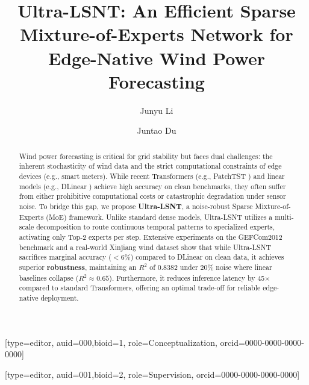 \documentclass[a4paper,fleqn]{cas-sc}
\begin{document}
\let\WriteBookmarks\relax
\def\floatpagepagefraction{1}
\def\textpagefraction{.001}


\title [mode = title]{Ultra-LSNT: An Efficient Sparse Mixture-of-Experts Network for Edge-Native Wind Power Forecasting}

\author[1]{Junyu Li}[type=editor,
                        auid=000,bioid=1,
                        role=Conceptualization,
                        orcid=0000-0000-0000-0000]
\cormark[2] %

\author[1]{Juntao Du}[type=editor,
                        auid=001,bioid=2,
                        role=Supervision,
                        orcid=0000-0000-0000-0000]
\cormark[1] %

\address[1]{School of Statistics and Applied Mathematics, Anhui University of Finance and Economics, Bengbu 233030, China}

\begin{abstract}
Wind power forecasting is critical for grid stability but faces dual challenges: the inherent stochasticity of wind data and the strict computational constraints of edge devices (e.g., smart meters). While recent Transformers (e.g., PatchTST \cite{patchtst2023}) and linear models (e.g., DLinear \cite{dlinear2023}) achieve high accuracy on clean benchmarks, they often suffer from either prohibitive computational costs or catastrophic degradation under sensor noise. To bridge this gap, we propose \textbf{Ultra-LSNT}, a noise-robust Sparse Mixture-of-Experts (MoE) framework. Unlike standard dense models, Ultra-LSNT utilizes a multi-scale decomposition to route continuous temporal patterns to specialized experts, activating only Top-2 experts per step. Extensive experiments on the GEFCom2012 benchmark and a real-world Xinjiang wind dataset show that while Ultra-LSNT sacrifices marginal accuracy ($<6\%$) compared to DLinear on clean data, it achieves superior \textbf{robustness}, maintaining an $R^2$ of 0.8382 under 20\% noise where linear baselines collapse ($R^2 \approx 0.65$). Furthermore, it reduces inference latency by 45$\times$ compared to standard Transformers, offering an optimal trade-off for reliable edge-native deployment.
\end{abstract}
\end{document}
